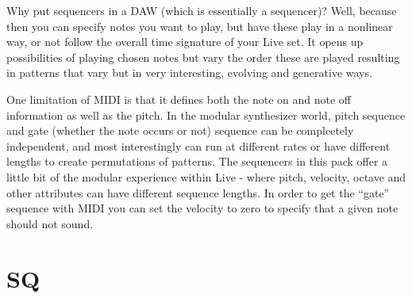 \documentclass[
  12pt,
  letterpaper,
  oneside,
  open=any]{scrbook}
\begin{document}
\begin{tcolorbox}[enhanced jigsaw, opacitybacktitle=0.6, rightrule=.15mm, leftrule=.75mm, opacityback=0, toptitle=1mm, toprule=.15mm, breakable, titlerule=0mm, colback=white, bottomtitle=1mm, title=\textcolor{quarto-callout-tip-color}{\faLightbulb}\hspace{0.5em}{Key idea}, coltitle=black, left=2mm, colframe=quarto-callout-tip-color-frame, bottomrule=.15mm, colbacktitle=quarto-callout-tip-color!10!white, arc=.35mm]

Why put sequencers in a DAW (which is essentially a sequencer)? Well,
because then you can specify notes you want to play, but have these play
in a nonlinear way, or not follow the overall time signature of your
Live set. It opens up possibilities of playing chosen notes but vary the
order these are played resulting in patterns that vary but in very
interesting, evolving and generative ways.

One limitation of MIDI is that it defines both the note on and note off
information as well as the pitch. In the modular synthesizer world,
pitch sequence and gate (whether the note occurs or not) sequence can be
compleetely independent, and most interestingly can run at different
rates or have different lengths to create permutations of patterns. The
sequencers in this pack offer a little bit of the modular experience
within Live - where pitch, velocity, octave and other attributes can
have different sequence lengths. In order to get the ``gate'' sequence
with MIDI you can set the velocity to zero to specify that a given note
should not sound.

\end{tcolorbox}

\section{SQ}\label{sq}
\end{document}
